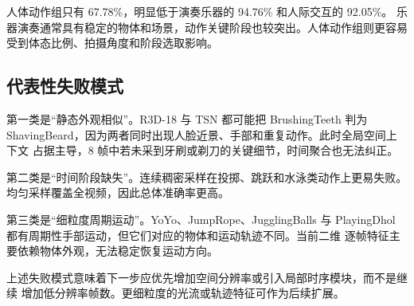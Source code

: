 人体动作组只有 67.78\%，明显低于演奏乐器的 94.76\% 和人际交互的 92.05\%。
乐器演奏通常具有稳定的物体和场景，动作关键阶段也较突出。人体动作组则更容易
受到体态比例、拍摄角度和阶段选取影响。

\subsection{代表性失败模式}

第一类是“静态外观相似”。R3D-18 与 TSN 都可能把 BrushingTeeth 判为
ShavingBeard，因为两者同时出现人脸近景、手部和重复动作。此时全局空间上下文
占据主导，8 帧中若未采到牙刷或剃刀的关键细节，时间聚合也无法纠正。

第二类是“时间阶段缺失”。连续稠密采样在投掷、跳跃和水泳类动作上更易失败。
均匀采样覆盖全视频，因此总体准确率更高。

第三类是“细粒度周期运动”。YoYo、JumpRope、JugglingBalls 与
PlayingDhol 都有周期性手部运动，但它们对应的物体和运动轨迹不同。当前二维
逐帧特征主要依赖物体外观，无法稳定恢复运动方向。

上述失败模式意味着下一步应优先增加空间分辨率或引入局部时序模块，而不是继续
增加低分辨率帧数。更细粒度的光流或轨迹特征可作为后续扩展。
